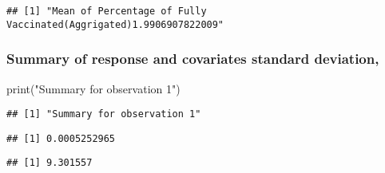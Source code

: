 \documentclass[
  12pt,
]{article}
\newenvironment{Shaded}{\begin{snugshade}}{\end{snugshade}}
\newcommand{\FunctionTok}[1]{\textcolor[rgb]{0.00,0.00,0.00}{#1}}
\newcommand{\NormalTok}[1]{#1}
\newcommand{\SpecialCharTok}[1]{\textcolor[rgb]{0.00,0.00,0.00}{#1}}
\newcommand{\StringTok}[1]{\textcolor[rgb]{0.31,0.60,0.02}{#1}}
\begin{document}
\begin{verbatim}
## [1] "Mean of Percentage of Fully Vaccinated(Aggrigated)1.9906907822009"
\end{verbatim}

\hypertarget{summary-of-response-and-covariates-standard-deviation}{%
\subsubsection{Summary of response and covariates standard
deviation,}\label{summary-of-response-and-covariates-standard-deviation}}

\begin{Shaded}
\begin{Highlighting}[]
\FunctionTok{print}\NormalTok{(}\StringTok{"Summary for observation 1"}\NormalTok{)}
\end{Highlighting}
\end{Shaded}

\begin{verbatim}
## [1] "Summary for observation 1"
\end{verbatim}

\begin{Shaded}
\end{Shaded}

\begin{verbatim}
## [1] 0.0005252965
\end{verbatim}

\begin{Shaded}
\end{Shaded}

\begin{verbatim}
## [1] 9.301557
\end{verbatim}

\begin{Shaded}
\end{Shaded}
\end{document}
